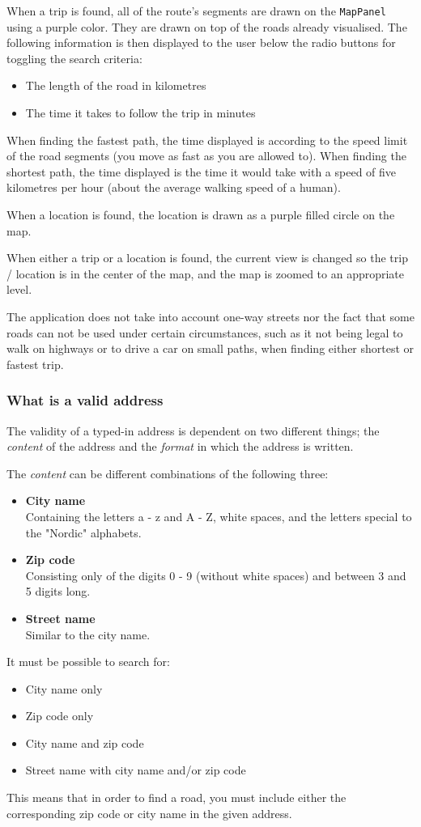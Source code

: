 When a trip is found, all of the route's segments are drawn on the \texttt{MapPanel} using a purple color. They are drawn on top of the roads already visualised. The following information is then displayed to the user below the radio buttons for toggling the search criteria:
\begin{itemize}
	\item The length of the road in kilometres
	\item The time it takes to follow the trip in minutes
\end{itemize}
When finding the fastest path, the time displayed is according to the speed limit of the road segments (you move as fast as you are allowed to). When finding the shortest path, the time displayed is the time it would take with a speed of five kilometres per hour (about the average walking speed of a human).

When a location is found, the location is drawn as a purple filled circle on the map.

When either a trip or a location is found, the current view is changed so the trip / location is in the center of the map, and the map is zoomed to an appropriate level.

The application does not take into account one-way streets nor the fact that some roads can not be used under certain circumstances, such as it not being legal to walk on highways or to drive a car on small paths, when finding either shortest or fastest trip.

\subsubsection{What is a valid address}
\label{sec: What is a valid address}
\label{sec:What is a valid address}
The validity of a typed-in address is dependent on two different things; the \textit{content} of the address and the \textit{format} in which the address is written.

The \textit{content} can be different combinations of the following three:
\begin{itemize}
	\item \textbf{City name} \\
		Containing the letters a - z and A - Z, white spaces, and the letters special to the "Nordic" alphabets.
	\item \textbf{Zip code} \\
		Consisting only of the digits 0 - 9 (without white spaces) and between 3 and 5 digits long.
	\item \textbf{Street name} \\
		Similar to the city name.
\end{itemize}
It must be possible to search for:
\begin{itemize}
	\item City name only
	\item Zip code only
	\item City name and zip code
	\item Street name with city name and/or zip code
\end{itemize}
This means that in order to find a road, you must include either the corresponding zip code or city name in the given address.

